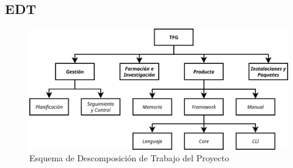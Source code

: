 














\subsection{EDT}\label{subsec:edt}

\begin{figure}[H]
    \centering
    \includegraphics[width=0.85\linewidth]{5-Cuerpo/Chapter2/EDT.png}
    \caption[EDT del Proyecto]{Esquema de Descomposición de Trabajo del Proyecto}\label{fig:EDT}
\end{figure}

